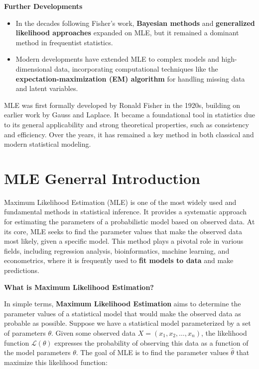 \documentclass[
  12 pt,
  a4paper,
]{book}
\providecommand{\tightlist}{%
  \setlength{\itemsep}{0pt}\setlength{\parskip}{0pt}}
\numberwithin{equation}{section}
\theoremstyle{plain}      %
\theoremstyle{definition} %
\theoremstyle{remark}     %
\theoremstyle{note}         %
\begin{document}
\textbf{Further Developments}

\begin{itemize}
\tightlist
\item
  In the decades following Fisher's work, \textbf{Bayesian methods} and
  \textbf{generalized likelihood approaches} expanded on MLE, but it
  remained a dominant method in frequentist statistics.
\item
  Modern developments have extended MLE to complex models and
  high-dimensional data, incorporating computational techniques like the
  \textbf{expectation-maximization (EM) algorithm} for handling missing
  data and latent variables.
\end{itemize}

MLE was first formally developed by Ronald Fisher in the 1920s, building
on earlier work by Gauss and Laplace. It became a foundational tool in
statistics due to its general applicability and strong theoretical
properties, such as consistency and efficiency. Over the years, it has
remained a key method in both classical and modern statistical modeling.

\newpage

\hypertarget{mle-generral-introduction}{%
\section{MLE Generral Introduction}\label{mle-generral-introduction}}

Maximum Likelihood Estimation (MLE) is one of the most widely used and
fundamental methods in statistical inference. It provides a systematic
approach for estimating the parameters of a probabilistic model based on
observed data. At its core, MLE seeks to find the parameter values that
make the observed data most likely, given a specific model. This method
plays a pivotal role in various fields, including regression analysis,
bioinformatics, machine learning, and econometrics, where it is
frequently used to \textbf{fit models to data} and make predictions.

\textbf{What is Maximum Likelihood Estimation?}

In simple terms, \textbf{Maximum Likelihood Estimation} aims to
determine the parameter values of a statistical model that would make
the observed data as probable as possible. Suppose we have a statistical
model parameterized by a set of parameters \(\theta\). Given some
observed data \(X = (x_1, x_2, \dots, x_n)\), the likelihood function
\(\mathcal{L}(\theta)\) expresses the probability of observing this data
as a function of the model parameters \(\theta\). The goal of MLE is to
find the parameter values \(\hat{\theta}\) that maximize this likelihood
function:
\end{document}
